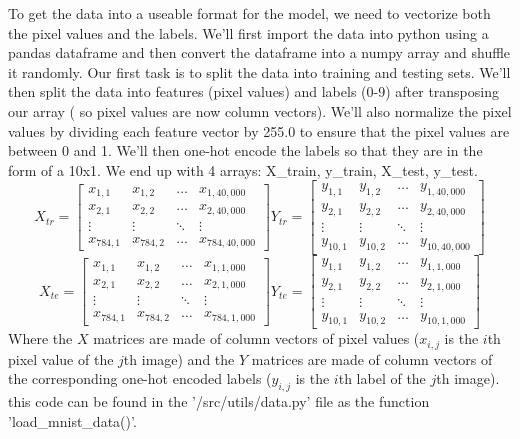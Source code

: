 \documentclass[11pt]{article}
\theoremstyle{definition}
\begin{document}
To get the data into a useable format for the model, we need to vectorize both the 
pixel values and the labels. We'll first import the data into python using a pandas 
dataframe and then convert the dataframe into a numpy array and shuffle it randomly. 
Our first task is to split the data into training and testing sets. We'll then split
the data into features (pixel values) and labels (0-9) after transposing our array (
so pixel values are now column vectors). We'll also normalize the pixel values by
dividing each feature vector by 255.0 to ensure that the pixel values are between 0
and 1. We'll then one-hot encode the labels so that they are in the form of a 10x1.
We end up with 4 arrays: X\_train, y\_train, X\_test, y\_test. 
\begin{equation}
    X_{tr} = \begin{bmatrix}
        x_{1,1} & x_{1,2} & \dots & x_{1, 40,000} \\
        x_{2,1} & x_{2,2} & \dots & x_{2, 40,000} \\
        \vdots & \vdots & \ddots & \vdots \\
        x_{784, 1} & x_{784, 2} & \dots & x_{784, 40,000}
    \end{bmatrix}
    Y_{tr} = \begin{bmatrix}
        y_{1,1} & y_{1,2} & \dots & y_{1, 40,000} \\
        y_{2,1} & y_{2,2} & \dots & y_{2, 40,000} \\
        \vdots & \vdots & \ddots & \vdots \\
        y_{10,1} & y_{10,2} & \dots & y_{10, 40,000}
    \end{bmatrix}
\end{equation}
\begin{equation}
    X_{te} = \begin{bmatrix}
        x_{1,1} & x_{1,2} & \dots & x_{1, 1,000} \\
        x_{2,1} & x_{2,2} & \dots & x_{2, 1,000} \\
        \vdots & \vdots & \ddots & \vdots \\
        x_{784, 1} & x_{784, 2} & \dots & x_{784, 1,000}
    \end{bmatrix}
    Y_{te} = \begin{bmatrix}
        y_{1,1} & y_{1,2} & \dots & y_{1, 1,000} \\
        y_{2,1} & y_{2,2} & \dots & y_{2, 1,000} \\
        \vdots & \vdots & \ddots & \vdots \\
        y_{10,1} & y_{10,2} & \dots & y_{10, 1,000}
    \end{bmatrix}
\end{equation}
Where the $X$ matrices are made of column vectors of pixel values ($x_{i,j}$ is the
$i$th pixel value of the $j$th image) and the $Y$ matrices are made of column vectors
of the corresponding one-hot encoded labels ($y_{i,j}$ is the $i$th label of the $j$th
image). this code can be found in the '/src/utils/data.py' file as the function 
'load\_mnist\_data()'.
\end{document}
